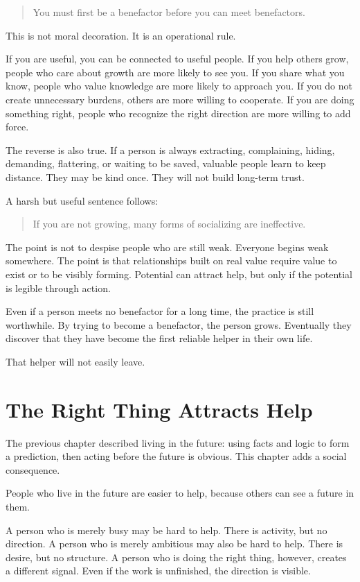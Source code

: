 \begin{quote}
You must first be a benefactor before you can meet benefactors.
\end{quote}

This is not moral decoration. It is an operational rule.

If you are useful, you can be connected to useful people. If you help others grow, people who care about growth are more likely to see you. If you share what you know, people who value knowledge are more likely to approach you. If you do not create unnecessary burdens, others are more willing to cooperate. If you are doing something right, people who recognize the right direction are more willing to add force.

The reverse is also true. If a person is always extracting, complaining, hiding, demanding, flattering, or waiting to be saved, valuable people learn to keep distance. They may be kind once. They will not build long-term trust.

A harsh but useful sentence follows:

\begin{quote}
If you are not growing, many forms of socializing are ineffective.
\end{quote}

The point is not to despise people who are still weak. Everyone begins weak somewhere. The point is that relationships built on real value require value to exist or to be visibly forming. Potential can attract help, but only if the potential is legible through action.

Even if a person meets no benefactor for a long time, the practice is still worthwhile. By trying to become a benefactor, the person grows. Eventually they discover that they have become the first reliable helper in their own life.

That helper will not easily leave.

\section*{The Right Thing Attracts Help}

The previous chapter described living in the future: using facts and logic to form a prediction, then acting before the future is obvious. This chapter adds a social consequence.

People who live in the future are easier to help, because others can see a future in them.

A person who is merely busy may be hard to help. There is activity, but no direction. A person who is merely ambitious may also be hard to help. There is desire, but no structure. A person who is doing the right thing, however, creates a different signal. Even if the work is unfinished, the direction is visible.

